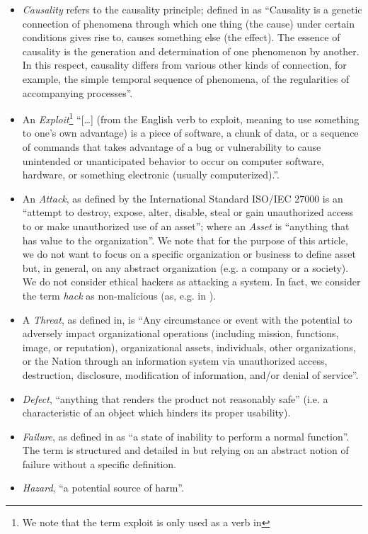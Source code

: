 \begin{itemize}
	\item \emph{Causality} refers to the causality principle; defined
		in\autocite{Spirkin1983Dialectical} as ``Causality is a genetic
		connection of phenomena through which one thing (the cause)
		under certain conditions gives rise to, causes something else
		(the effect). The essence of causality is the generation and
		determination of one phenomenon by another. In this respect,
		causality differs from various other kinds of connection, for
		example, the simple temporal sequence of phenomena, of the
		regularities of accompanying processes''.
	\item An \emph{Exploit}\footnote{We note that the term exploit is only
		used as a verb in\autocite{ISO2009information}} ``[\ldots]
		(from the English verb to exploit, meaning to use something to
		one’s own advantage) is a piece of software, a chunk of data,
		or a sequence of commands that takes advantage of a bug or
		vulnerability to cause unintended or unanticipated behavior to
		occur on computer software, hardware, or something electronic
		(usually computerized).''\autocite{wiki-exploit}.
	\item An \emph{Attack}, as defined by the International Standard
		ISO/IEC 27000 is an ``attempt to destroy, expose, alter,
		disable, steal or gain unauthorized access to or make
		unauthorized use of an asset''; where an \emph{Asset} is
		``anything that has value to the organization''. We note that for
		the purpose of this article, we do not want to focus on a specific
		organization or business to define asset but, in general, on any 
		abstract organization (e.g. a company or a society).
		We do not consider ethical hackers as attacking a system. 
		In fact, we consider the term \emph{hack} as
		non-malicious (as, e.g. in \autocite{Stallman2002hacker}).
	\item A \emph{Threat}, as defined in\autocite{cnssi20104009}, is ``Any
		circumstance or event with the potential to adversely impact
		organizational operations (including mission, functions, image,
		or reputation), organizational assets, individuals, other
		organizations, or the Nation through an information system via
		unauthorized access, destruction, disclosure, modification of
		information, and/or denial of service''.
	\item \emph{Defect}, ``anything that renders the product not reasonably
		safe''\autocite{Robinson2019writing} (i.e. a characteristic of
		an object which hinders its proper usability).
	\item \emph{Failure}, as defined in\autocite{Merriam2020failure} as ``a state of
		inability to perform a normal function''. The term is
		structured and detailed in
		\autocite{cnssi20104009,iet2017glossary} but relying on an
		abstract notion of failure without a specific definition.
	\item \emph{Hazard}, ``a potential source of
		harm''\autocite{iet2017glossary}.
\end{itemize}
